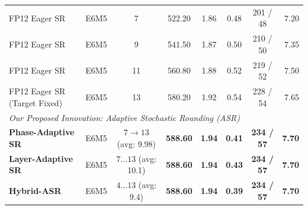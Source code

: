 \begin{table}[t]
\begin{tabular}{lccccccr}
FP12 Eager SR & E6M5 & 7 & 522.20 & 1.86 & 0.48 & 201 / 48 & 7.20 \\
FP12 Eager SR & E6M5 & 9 & 541.50 & 1.87 & 0.50 & 210 / 50 & 7.35 \\
FP12 Eager SR & E6M5 & 11 & 560.80 & 1.88 & 0.52 & 219 / 52 & 7.50 \\
FP12 Eager SR (Target Fixed) & E6M5 & 13 & 580.20 & 1.92 & 0.54 & 228 / 54 & 7.65 \\
\midrule
\multicolumn{8}{l}{\textit{Our Proposed Innovation: Adaptive Stochastic Rounding (ASR)}} \\
\textbf{Phase-Adaptive SR} & E6M5 & $7 \to 13$ (avg: 9.98) & \textbf{588.60} & \textbf{1.94} & \textbf{0.41} & \textbf{234 / 57} & \textbf{7.70} \\
\textbf{Layer-Adaptive SR} & E6M5 & $7 \dots 13$ (avg: 10.1) & \textbf{588.60} & \textbf{1.94} & \textbf{0.43} & \textbf{234 / 57} & \textbf{7.70} \\
\textbf{Hybrid-ASR} & E6M5 & $4 \dots 13$ (avg: 9.4) & \textbf{588.60} & \textbf{1.94} & \textbf{0.39} & \textbf{234 / 57} & \textbf{7.70} \\
\bottomrule
\end{tabular}
\end{table}

